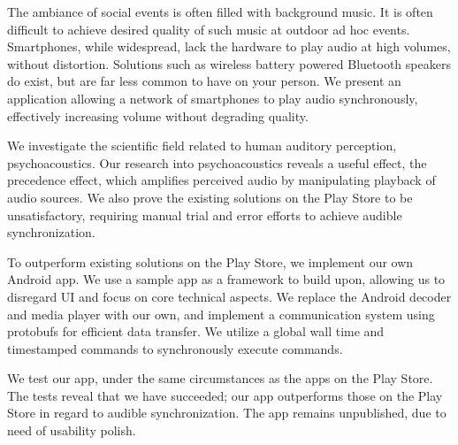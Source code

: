 The ambiance of social events is often filled with background music.
It is often difficult to achieve desired quality of such music at outdoor ad hoc events.
Smartphones, while widespread, lack the hardware to play audio at high volumes, without distortion.
Solutions such as wireless battery powered Bluetooth speakers do exist, but are far less common to have on your person.
We present an application allowing a network of smartphones to play audio synchronously, effectively increasing volume without degrading quality.

\bigskip \noindent
We investigate the scientific field related to human auditory perception, psychoacoustics.
Our research into psychoacoustics reveals a useful effect, the precedence effect, which amplifies perceived audio by manipulating playback of audio sources.
We also prove the existing solutions on the Play Store to be unsatisfactory, requiring manual trial and error efforts to achieve audible synchronization. 

\bigskip \noindent
To outperform existing solutions on the Play Store, we implement our own Android app.
We use a sample app as a framework to build upon, allowing us to disregard UI and focus on core technical aspects.
We replace the Android decoder and media player with our own, and implement a communication system using protobufs for efficient data transfer.
We utilize a global wall time and timestamped commands to synchronously execute commands.

\bigskip \noindent
We test our app, under the same circumstances as the apps on the Play Store.
The tests reveal that we have succeeded; our app outperforms those on the Play Store in regard to audible synchronization.
The app remains unpublished, due to need of usability polish.
